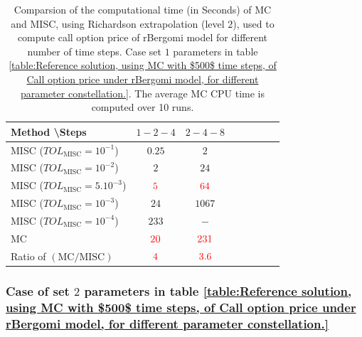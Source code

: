 \begin{table}[!h]
	\centering
	\begin{tabular}{l*{6}{c}r}
		Method \textbackslash  Steps            & $1-2-4$ & $2-4-8$   \\
		\hline
		MISC ($TOL_{\text{MISC}}=10^{-1}$)  & $0.25$ & $2$ &   \\
		MISC ($TOL_{\text{MISC}}=10^{-2}$)  & $2$ & $24$   \\
		MISC ($TOL_{\text{MISC}}=5.10^{-3}$)  & ${\color{red}5}$ & ${\color{red}64}$  \\	
		MISC ($TOL_{\text{MISC}}=10^{-3}$)  & $24$ & $1067$  \\	
		MISC ($TOL_{\text{MISC}}=10^{-4}$)  & $ 233$ & $-$   \\
		\hline
		MC    & ${\color{red}20}$  & ${\color{red}231}$  \\
		
		\hline
		Ratio of $\left(\text{MC}/ \text{MISC} \right)$  &${\color{red}4}$ & ${\color{red}  3.6}$   \\
		\hline
	\end{tabular}
	\caption{Comparsion of the computational time (in Seconds) of  MC and MISC, using Richardson extrapolation (level $2$), used to compute call option price of rBergomi model for different number of time steps. Case set $1$ parameters in table \ref{table:Reference solution, using MC with $500$ time steps, of Call option price under rBergomi model, for different parameter constellation.}. The
		average MC CPU time is computed over 10 runs.}
	\label{Comparsion of the computational time of  MC and MISC, using Richardson extrapolation (level $2$), used to compute Call option price of rBergomi model for different number of time steps. Case set $1$ parameters}
\end{table}
















\subsubsection{Case of set $2$ parameters in table \ref{table:Reference solution, using MC with $500$ time steps, of Call option price under rBergomi model, for different parameter constellation.} }
\label{sec:Case of set $2$ parameters_linear}


